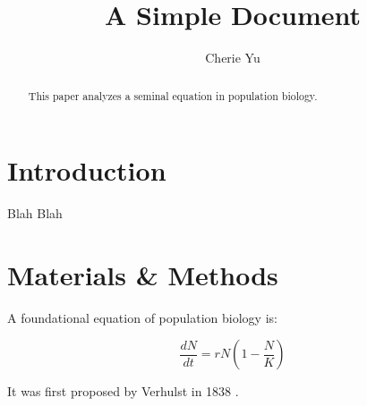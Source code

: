 \documentclass[12pt]{article}
\title{A Simple Document}
\author{Cherie Yu}
\date{}
\begin{document}
  \maketitle
  
  \begin{abstract}
    This paper analyzes a seminal equation in population biology.
  \end{abstract}
  
  \section{Introduction}
    Blah Blah
  
  \section{Materials \& Methods}
  
  A foundational equation of population biology is:
  
  \begin{equation}
    \frac{dN}{dt} = r N (1 - \frac{N}{K})
  \end{equation}
  
  It was first proposed by Verhulst in 1838 \cite{verhulst1838notice}.
  
  
  
  
\end{document}

